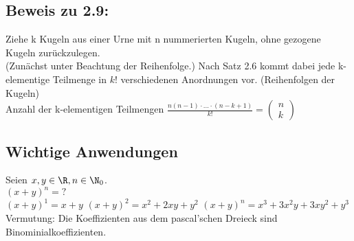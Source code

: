 \subsection*{Beweis zu 2.9:}
Ziehe k Kugeln aus einer Urne mit n nummerierten Kugeln, ohne gezogene Kugeln zurückzulegen.\\
(Zunächst unter Beachtung der Reihenfolge.)
Nach Satz 2.6 kommt dabei jede k-elementige Teilmenge in $k!$ verschiedenen Anordnungen vor. (Reihenfolgen der Kugeln)\\
Anzahl der k-elementigen Teilmengen $\frac{n(n-1) \cdot ... \cdot (n-k+1)}{k!} = \begin{pmatrix}
n\\k
\end{pmatrix}$\\
\subsection*{Wichtige Anwendungen}
Seien $x, y\in \R, n \in \N_0$.\\
$(x+y)^n = ?$\\
$(x+y)^1 = x+y$
$(x+y)^2 = x^2 + 2xy + y^2$
$(x+y)^n = x^3 + 3x^2y + 3xy^2 + y^3$
Vermutung: Die Koeffizienten aus dem pascal'schen Dreieck sind Binominialkoeffizienten.